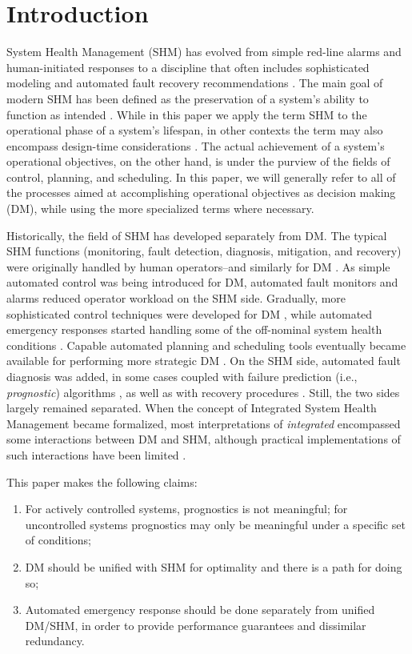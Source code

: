 \section{Introduction}

System Health Management (SHM) has evolved from simple red-line alarms and human-initiated responses to a discipline that often includes sophisticated modeling and automated fault recovery recommendations \cite{Aaseng2001abr}. The main goal of modern SHM has been defined as the preservation of a system's ability to function as intended \cite{Rasmussen2008,Johnson2011a}. While in this paper we apply the term SHM to the operational phase of a system's lifespan, in other contexts the term may also encompass design-time considerations \cite{Johnson2011a}. The actual achievement of a system's operational objectives, on the other hand, is under the purview of the fields of control, planning, and scheduling. In this paper, we will generally refer to all of the processes aimed at accomplishing operational objectives as decision making (DM), while using the more specialized terms where necessary.

Historically, the field of SHM has developed separately from DM. The typical SHM functions (monitoring, fault detection, diagnosis, mitigation, and recovery) were originally handled by human operators--and similarly for DM \cite{Aaseng2001abr,Ogata2010}. As simple automated control was being introduced for DM, automated fault monitors and alarms reduced operator workload on the SHM side. Gradually, more sophisticated control techniques were developed for DM \cite{Ogata2010}, while automated emergency responses started handling some of the off-nominal system health conditions \cite{Rasmussen2008}. Capable automated planning and scheduling tools eventually became available for performing more strategic DM \cite{Ghallab2016}. On the SHM side, automated fault diagnosis was added, in some cases coupled with failure prediction (i.e., \textit{prognostic}) algorithms \cite{Lu1979}, as well as with recovery procedures \cite{Avizienis1976}. Still, the two sides largely remained separated. When the concept of Integrated System Health Management became formalized, most interpretations of \textit{integrated} encompassed some interactions between DM and SHM, although practical implementations of such interactions have been limited \cite{Figueroa2018}.

This paper makes the following claims:

\begin{enumerate}

	\item For actively controlled systems, prognostics is not meaningful; for uncontrolled systems prognostics may only be meaningful under a specific set of conditions;
	\item DM should be unified with SHM for optimality and there is a path for doing so;
	\item Automated emergency response should be done separately from unified DM/SHM, in order to provide performance guarantees and dissimilar redundancy.

\end{enumerate}

